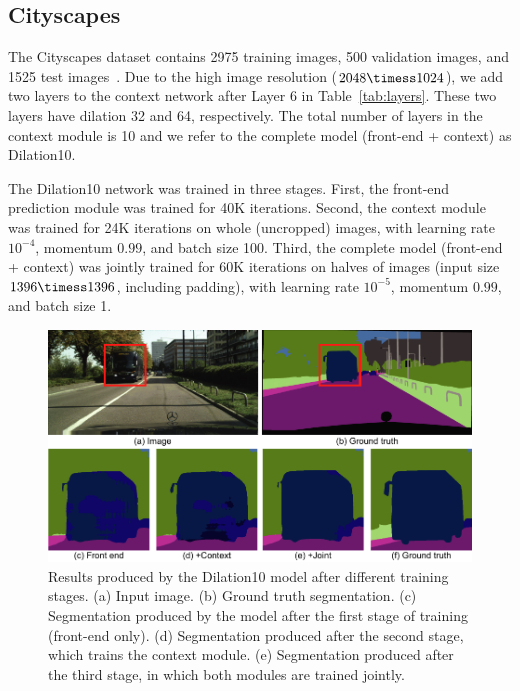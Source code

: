 \begin{appendices}
\subsection{Cityscapes}


The Cityscapes dataset contains 2975 training images, 500 validation images, and 1525 test images~\citep{Cordts:2016:CVPR}. Due to the high image resolution ($2048 \timess 1024$), we add two layers to the context network after Layer 6 in Table~\ref{tab:layers}. These two layers have dilation 32 and 64, respectively. The total number of layers in the context module is 10 and we refer to the complete model (front-end + context) as Dilation10.

The Dilation10 network was trained in three stages. First, the front-end prediction module was trained for 40K iterations. Second, the context module was trained for 24K iterations on whole (uncropped) images, with learning rate $10^{-4}$, momentum $0.99$, and batch size 100. Third, the complete model (front-end + context) was jointly trained for 60K iterations on halves of images (input size
$1396 \timess 1396$, including padding), with learning rate $10^{-5}$, momentum $0.99$, and batch size
1.

\begin{figure}[t]
  \centering
  \includegraphics[width=\textwidth]{figs/cityscapes_stages_sm.pdf}
  \caption{Results produced by the Dilation10 model after different training stages. (a) Input image. (b) Ground truth segmentation. (c) Segmentation produced by the model after the first stage of training (front-end only). (d) Segmentation produced after the second stage, which trains the context module. (e) Segmentation produced after the third stage, in which both modules are trained jointly.}
  \label{fig:cityscapes_stages}
\end{figure}


\end{appendices}
